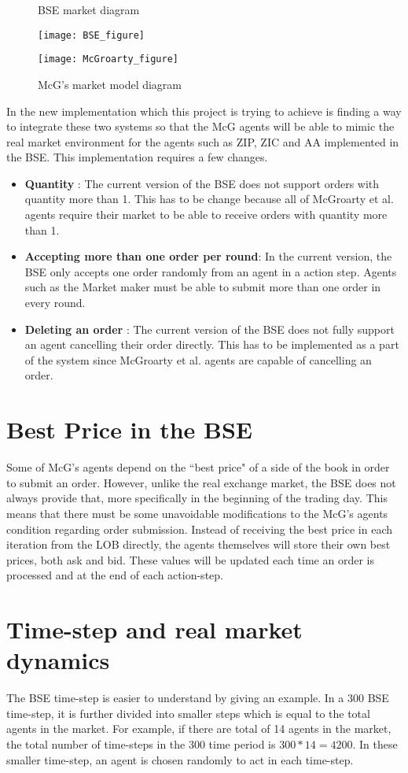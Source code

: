 \begin{figure}[h]
\caption{BSE market diagram} 
\texttt{[image: BSE\_figure]}
\caption{McG's market model diagram} 
\texttt{[image: McGroarty\_figure]}
\end{figure} 
\FloatBarrier

In the new implementation which this project is trying to achieve is finding a way to integrate these two systems so that the McG agents will be able to mimic the real market environment for the agents such as ZIP, ZIC and AA implemented in the BSE. This implementation requires a few changes.

\begin{itemize}
    \item  \textbf{Quantity} : The current version of the BSE does not support orders with quantity more than 1. This has to be change because all of McGroarty et al. agents require their market to be able to receive orders with quantity more than 1. 
    \item  \textbf{Accepting more than one order per round}: In the current version, the BSE only accepts one order randomly from an agent in a action step. Agents such as the Market maker must be able to submit more than one order in every round. 
    \item \textbf{Deleting an order} : The current version of the BSE does not fully support an agent cancelling their order directly. This has to be implemented as a part of the system since McGroarty et al. agents are capable of cancelling an order.
\end{itemize} 

\section{Best Price in the BSE}
Some of McG's agents depend on the ``best price" of a side of the book in order to submit an order. However, unlike the real exchange market, the BSE does not always provide that, more specifically in the beginning of the trading day. This means that there must be some unavoidable modifications to the McG's agents condition regarding order submission. Instead of receiving the best price in each iteration from the LOB directly, the agents themselves will store their own best prices, both ask and bid. These values will be updated each time an order is processed and at the end of each action-step. 



\section{Time-step and real market dynamics}
The BSE time-step is easier to understand by giving an example. In a 300 BSE time-step, it is further divided into smaller steps which is equal to the total agents in the market. For example, if there are total of 14 agents in the market, the total number of time-steps in the 300 time period is $300 * 14 = 4200$. In these smaller time-step, an agent is chosen randomly to act in each time-step. 

